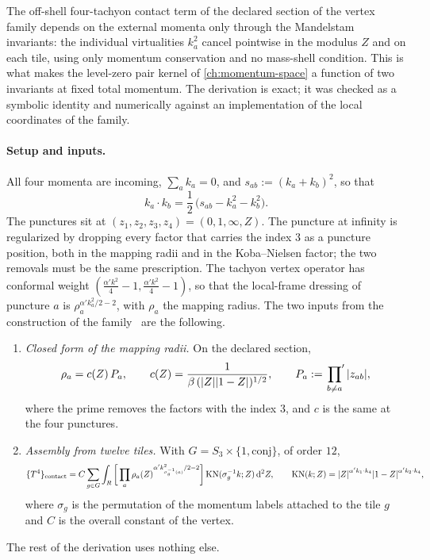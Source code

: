 The off-shell four-tachyon contact term of the declared section of the vertex family depends on the external momenta only through the Mandelstam invariants: the individual virtualities $k_a^2$ cancel pointwise in the modulus $Z$ and on each tile, using only momentum conservation and no mass-shell condition.
This is what makes the level-zero pair kernel of \cref{ch:momentum-space} a function of two invariants at fixed total momentum.
The derivation is exact; it was checked as a symbolic identity and numerically against an implementation of the local coordinates of the family.

\paragraph{Setup and inputs.}
All four momenta are incoming, $\sum_a k_a = 0$, and $s_{ab} := (k_a + k_b)^2$, so that
\begin{equation}
  k_a \cdot k_b
    = \frac{1}{2} \, \big( s_{ab} - k_a^2 - k_b^2 \big).
\end{equation}
The punctures sit at $(z_1, z_2, z_3, z_4) = (0, 1, \infty, Z)$.
The puncture at infinity is regularized by dropping every factor that carries the index $3$ as a puncture position, both in the mapping radii and in the Koba--Nielsen factor; the two removals must be the same prescription.
The tachyon vertex operator has conformal weight $(\frac{\alpha' k^2}{4} - 1, \frac{\alpha' k^2}{4} - 1)$, so that the local-frame dressing of puncture $a$ is $\rho_a^{\alpha' k_a^2 / 2 - 2}$, with $\rho_a$ the mapping radius.
The two inputs from the construction of the family~\cite{Erbin:2026:SL2CVerticesClosed} are the following.
\begin{enumerate}
  \item \emph{Closed form of the mapping radii.} On the declared section,
    \begin{equation}
      \label{eq:sl2c:radii}
      \rho_a
        = c(Z) \, P_a,
      \qquad
      c(Z)
        = \frac{1}{\beta \, ({|Z|} {|1 - Z|})^{1/2}},
      \qquad
      P_a
        := \sideset{}{'}\prod_{b \ne a} {|z_{ab}|},
    \end{equation}
    where the prime removes the factors with the index $3$, and $c$ is the same at the four punctures.
  \item \emph{Assembly from twelve tiles.} With $G = S_3 \times \{ 1, \mathrm{conj} \}$, of order $12$,
    \begin{equation}
      \label{eq:sl2c:tiles}
      \{ T^4 \}_{\rm contact}
        = C \sum_{g \in G} \int_R \bigg[ \prod_a \rho_a(Z)^{\alpha' k_{\sigma_g^{-1}(a)}^2 / 2 - 2} \bigg] \, \mathrm{KN}(\sigma_g^{-1} k; Z) \, \mathrm{d}^2 Z,
      \qquad
      \mathrm{KN}(k; Z)
        = {|Z|}^{\alpha' k_1 \cdot k_4} {|1 - Z|}^{\alpha' k_2 \cdot k_4},
    \end{equation}
    where $\sigma_g$ is the permutation of the momentum labels attached to the tile $g$ and $C$ is the overall constant of the vertex.
\end{enumerate}
The rest of the derivation uses nothing else.

